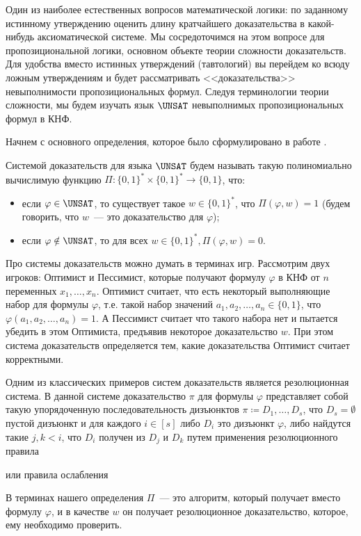 Один из наиболее естественных вопросов математической логики: по заданному истинному утверждению оценить
длину кратчайшего доказательства в какой-нибудь аксиоматической системе. Мы сосредоточимся на этом
вопросе для пропозициональной логики, основном объекте теории сложности доказательств. Для удобства
вместо истинных утверждений (тавтологий) вы перейдем ко всюду ложным утверждениям и будет рассматривать
<<доказательства>> невыполнимости пропозициональных формул. Следуя терминологии теории сложности, мы
будем изучать язык $\UNSAT$ невыполнимых пропозициональных формул в КНФ.

Начнем с основного определения, которое было сформулировано в работе \cite{CookRec79}. 
\begin{definition*}
    Системой доказательств для языка $\UNSAT$ будем называть такую полиномиально вычислимую функцию
    $\Pi\colon \{0, 1\}^* \times \{0, 1\}^* \to \{0, 1\}$, что:
    \begin{itemize}
        \item если $\varphi \in \UNSAT$, то существует такое $w \in \{0, 1\}^*$, что $\Pi(\varphi, w) = 1$
            (будем говорить, что $w$~--- это доказательство для $\varphi$);
        \item если $\varphi \notin \UNSAT$, то для всех $w \in \{0, 1\}^*, \Pi(\varphi, w) = 0$.
    \end{itemize}
\end{definition*}

Про системы доказательств можно думать в терминах игр. Рассмотрим двух игроков: Оптимист и Пессимист,
которые получают формулу $\varphi$ в КНФ от $n$ переменных $x_1, \dots, x_n$. Оптимист считает, что есть
некоторый выполняющие набор для формулы $\varphi$, т.е. такой набор значений $a_1, a_2, \dots, a_n \in
\{0, 1\}$, что $\varphi(a_1, a_2, \dots, a_n) = 1$. А Пессимист считает что такого набора нет и пытается
убедить в этом Оптимиста, предъявив некоторое доказательство $w$. При этом система доказательств
определяется тем, какие доказательства Оптимист считает корректными.

Одним из классических примеров систем доказательств является резолюционная система. В данной системе
доказательство $\pi$ для формулы $\varphi$ представляет собой такую упорядоченную последовательность
дизъюнктов $\pi \coloneqq D_1, \dots, D_{s}$, что $D_{s} = \emptyset$ пустой дизъюнкт и для каждого $i
\in [s]$ либо $D_i$ это дизъюнкт $\varphi$, либо найдутся такие $j, k < i$, что $D_i$ получен из $D_j$ и
$D_k$ путем применения резолюционного правила
\begin{prooftree}
\end{prooftree}
или правила ослабления
\begin{prooftree}
\end{prooftree}
В терминах нашего определения $\Pi$~--- это алгоритм, который получает вместо формулу $\varphi$, и в
качестве $w$ он получает резолюционное доказательство, которое, ему необходимо проверить.

